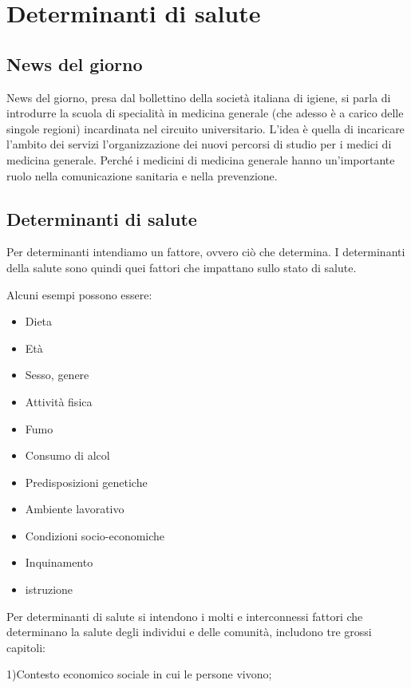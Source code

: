 \section{Determinanti di salute}

\subsection{News del giorno}

News del giorno, presa dal bollettino della società italiana di igiene,
si parla di introdurre la scuola di specialità in medicina generale (che
adesso è a carico delle singole regioni) incardinata nel circuito
universitario. L'idea è quella di incaricare l'ambito dei servizi
l'organizzazione dei nuovi percorsi di studio per i medici di medicina
generale. Perché i medicini di medicina generale hanno un'importante
ruolo nella comunicazione sanitaria e nella prevenzione.

\subsection{Determinanti di salute}

Per determinanti intendiamo un fattore, ovvero ciò che determina. I
determinanti della salute sono quindi quei fattori che impattano sullo
stato di salute.

Alcuni esempi possono essere:

\begin{itemize}
\item
  Dieta
\item
  Età
\item
  Sesso, genere
\item
  Attività fisica
\item
  Fumo
\item
  Consumo di alcol
\item
  Predisposizioni genetiche
\item
  Ambiente lavorativo
\item
  Condizioni socio-economiche
\item
  Inquinamento
\item
  istruzione
\end{itemize}

Per determinanti di salute si intendono i molti e interconnessi fattori
che determinano la salute degli individui e delle comunità, includono
tre grossi capitoli:

1)Contesto economico sociale in cui le persone vivono;

